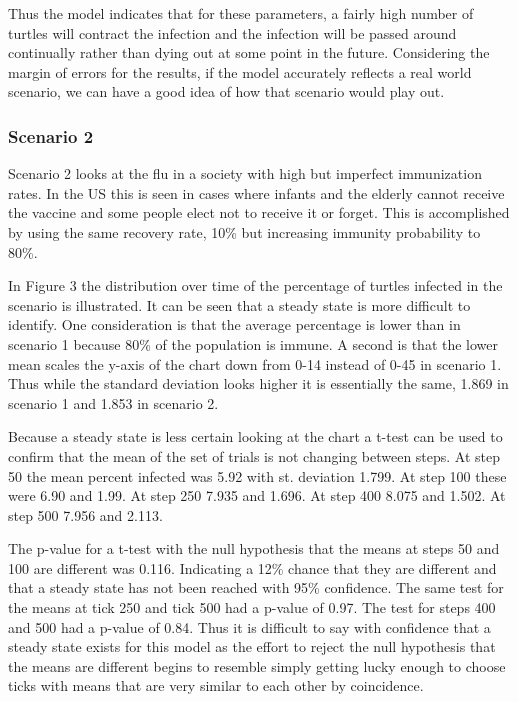 \documentclass[11pt]{article} %
\begin{document}

Thus the model indicates that for these parameters, a fairly high number of turtles will contract the infection and the infection will be passed around continually rather than dying out at some point in the future. Considering the margin of errors for the results, if the model accurately reflects a real world scenario, we can have a good idea of how that scenario would play out. 

\subsubsection{Scenario 2}

Scenario 2 looks at the flu in a society with high but imperfect immunization rates. In the US this is seen in cases where infants and the elderly cannot receive the vaccine and some people elect not to receive it or forget. This is accomplished by using the same recovery rate, 10\% but increasing immunity probability to 80\%. 



In Figure 3 the distribution over time of the percentage of turtles infected in the scenario is illustrated. It can be seen that a steady state is more difficult to identify. One consideration is that the average percentage is lower than in scenario 1 because 80\% of the population is immune. A second is that the lower mean scales the y-axis of the chart down from 0-14 instead of 0-45 in scenario 1. Thus while the standard deviation looks higher it is essentially the same, 1.869 in scenario 1 and 1.853 in scenario 2. 

Because a steady state is less certain looking at the chart a t-test can be used to confirm that the mean of the set of trials is not changing between steps. At step 50 the mean percent infected was 5.92 with st. deviation 1.799. At step 100 these were 6.90 and 1.99. At step 250 7.935 and 1.696. At step 400 8.075 and 1.502. At step 500 7.956 and 2.113. 

The p-value for a t-test with the null hypothesis that the means at steps 50 and 100 are different was 0.116. Indicating a 12\% chance that they are different and that a steady state has not been reached with 95\% confidence. The same test for the means at tick 250 and tick 500 had a p-value of 0.97. The test for steps 400 and 500 had a p-value of 0.84. Thus it is difficult to say with confidence that a steady state exists for this model as the effort to reject the null hypothesis that the means are different begins to resemble simply getting lucky enough to choose ticks with means that are very similar to each other by coincidence. 
\end{document}
